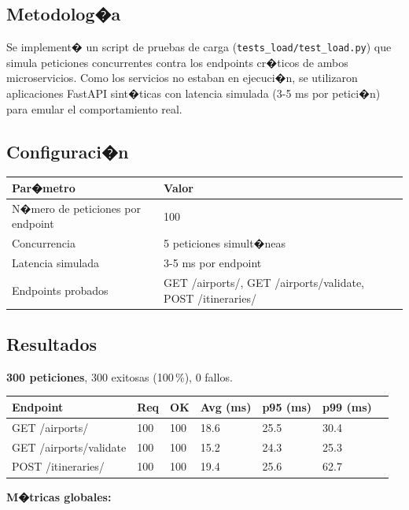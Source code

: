 \documentclass[12pt,a4paper]{article}
\begin{document}
\subsection{Metodolog�a}

Se implement� un script de pruebas de carga (\texttt{tests\_load/test\_load.py})
que simula peticiones concurrentes contra los endpoints cr�ticos de ambos
microservicios. Como los servicios no estaban en ejecuci�n, se utilizaron
aplicaciones FastAPI sint�ticas con latencia simulada (3-5 ms por petici�n)
para emular el comportamiento real.

\subsection{Configuraci�n}

\begin{tabularx}{\textwidth}{lX}
  \toprule
  \textbf{Par�metro} & \textbf{Valor} \\
  \midrule
  N�mero de peticiones por endpoint & 100 \\
  Concurrencia & 5 peticiones simult�neas \\
  Latencia simulada & 3-5 ms por endpoint \\
  Endpoints probados & GET /airports/, GET /airports/validate, POST /itineraries/ \\
  \bottomrule
\end{tabularx}

\subsection{Resultados}

\textbf{300 peticiones}, 300 exitosas (100\,\%), 0 fallos.

\vspace{0.3cm}
\begin{tabularx}{\textwidth}{lXXXXXX}
  \toprule
  \textbf{Endpoint} & \textbf{Req} & \textbf{OK} & \textbf{Avg (ms)} & \textbf{p95 (ms)} & \textbf{p99 (ms)} \\
  \midrule
  GET /airports/          & 100 & 100 & 18.6 & 25.5 & 30.4 \\
  GET /airports/validate  & 100 & 100 & 15.2 & 24.3 & 25.3 \\
  POST /itineraries/      & 100 & 100 & 19.4 & 25.6 & 62.7 \\
  \bottomrule
\end{tabularx}

\vspace{0.3cm}
\textbf{M�tricas globales:}
\end{document}

